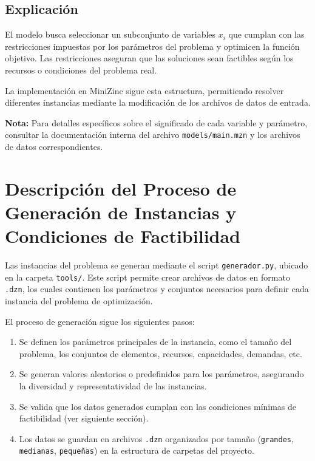 \documentclass[a4paper,12pt]{article}
\begin{document}
\subsection{Explicación}
El modelo busca seleccionar un subconjunto de variables $x_i$ que cumplan con las restricciones impuestas por los parámetros del problema y optimicen la función objetivo. Las restricciones aseguran que las soluciones sean factibles según los recursos o condiciones del problema real.

La implementación en MiniZinc sigue esta estructura, permitiendo resolver diferentes instancias mediante la modificación de los archivos de datos de entrada.

\textbf{Nota:} Para detalles específicos sobre el significado de cada variable y parámetro, consultar la documentación interna del archivo \texttt{models/main.mzn} y los archivos de datos correspondientes.

\section{Descripción del Proceso de Generación de Instancias y Condiciones de Factibilidad}
Las instancias del problema se generan mediante el script \texttt{generador.py}, ubicado en la carpeta \texttt{tools/}. Este script permite crear archivos de datos en formato \texttt{.dzn}, los cuales contienen los parámetros y conjuntos necesarios para definir cada instancia del problema de optimización.

El proceso de generación sigue los siguientes pasos:
\begin{enumerate}
    \item Se definen los parámetros principales de la instancia, como el tamaño del problema, los conjuntos de elementos, recursos, capacidades, demandas, etc.
    \item Se generan valores aleatorios o predefinidos para los parámetros, asegurando la diversidad y representatividad de las instancias.
    \item Se valida que los datos generados cumplan con las condiciones mínimas de factibilidad (ver siguiente sección).
    \item Los datos se guardan en archivos \texttt{.dzn} organizados por tamaño (\texttt{grandes}, \texttt{medianas}, \texttt{pequeñas}) en la estructura de carpetas del proyecto.
\end{enumerate}
\end{document}
